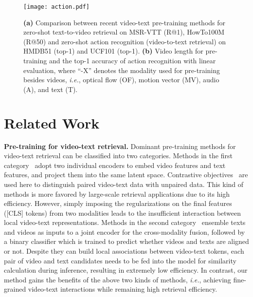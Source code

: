 \documentclass[10pt,twocolumn,letterpaper]{article}
\renewcommand{\paragraph}[1]{\vspace{1.25mm}\noindent\textbf{#1}}
\begin{document}
\begin{figure}
	\centering
	\texttt{[image: action.pdf]}
	\caption{\textbf{(a)} Comparison between recent video-text pre-training methods for zero-shot text-to-video retrieval on MSR-VTT (R@1), HowTo100M (R@50) and zero-shot action recognition (video-to-text retrieval) on HMDB51 (top-1) and UCF101 (top-1). \textbf{(b)} Video length for pre-training and the top-1 accuracy of action recognition with linear evaluation, where ``-X'' denotes the modality used for pre-training besides videos, \textit{i.e.}, optical flow (OF), motion vector (MV), audio (A), and text (T).}
	\vspace{-4mm}	
	\label{fig:hmdb}
\end{figure}
\section{Related Work}

\paragraph{Pre-training for video-text retrieval.}
Dominant pre-training methods for video-text retrieval can be classified into two categories.
Methods in the first category~\cite{frozen, MIL-NCE, videoclip, taco, coot,avlnet,support, multi,expert} adopt two individual encoders to embed video features and text features, and project them into the same latent space. 
Contrastive objectives~\cite{contrastive1,contrastive2} are used here to distinguish paired video-text data with unpaired data. 
This kind of methods is more favored by large-scale retrieval applications due to its high efficiency.
However, simply 
imposing the regularizations on the final features ([CLS] tokens) from two modalities leads to the insufficient interaction between local video-text representations.
Methods in the second category~\cite{clipbert,videobert,actbert,hero, univl, vlm} ensemble texts and videos as inputs to a joint encoder for the cross-modality fusion, followed by a binary classifier which is trained to predict whether videos and texts are aligned or not. 
Despite they can build local associations between video-text tokens, each pair of video and text candidates needs to be fed into the model for similarity calculation during inference, resulting in extremely low efficiency.
In contrast, our method gains the benefits of the above two kinds of methods, \textit{i.e.}, achieving fine-grained video-text interactions while remaining high retrieval efficiency.
\end{document}
